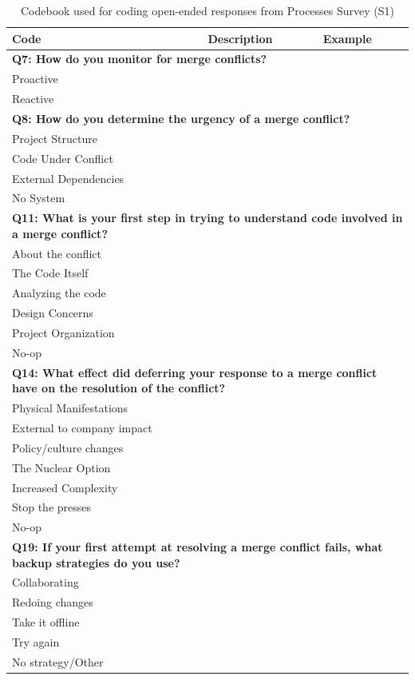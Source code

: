 \def\shift{\hspace{0.5em}}
\begin{table}[!htbp]
\centering
\caption{Codebook used for coding open-ended responses from Processes Survey (S1)}
\label{tab:codes}
\begin{tabular}{lp{1.5in}p{1.3in}}
\toprule
Code & Description & Example \\
\midrule
\multicolumn{3}{l}{\textbf{Q7: How do you monitor for merge conflicts?}} \\
\shift Proactive & & \\
\shift Reactive & & \\
\midrule
\multicolumn{3}{l}{\textbf{Q8: How do you determine the urgency of a merge conflict?}} \\
\shift Project Structure & & \\
\shift Code Under Conflict & & \\
\shift External Dependencies & & \\
\shift No System & & \\
\midrule
\multicolumn{3}{p{4.5in}}{\raggedright\textbf{Q11: What is your first step in trying to understand code involved in a merge conflict?}} \\
\shift About the conflict & & \\
\shift The Code Itself & & \\
\shift Analyzing the code & & \\
\shift Design Concerns & & \\
\shift Project Organization & & \\
\shift No-op & & \\
\midrule
\multicolumn{3}{p{4.5in}}{\raggedright\textbf{Q14: What effect did deferring your response to a merge conflict have on the resolution of the conflict?}} \\
\shift Physical Manifestations & & \\
\shift External to company impact & & \\
\shift Policy/culture changes & & \\
\shift The Nuclear Option & & \\
\shift Increased Complexity & & \\
\shift Stop the presses & & \\
\shift No-op & & \\
\midrule
\multicolumn{3}{p{4.5in}}{\raggedright\textbf{Q19: If your first attempt at resolving a merge conflict fails, what backup strategies do you use?}} \\
\shift Collaborating & & \\
\shift Redoing changes & & \\
\shift Take it offline & & \\
\shift Try again & & \\
\shift No strategy/Other & & \\
\bottomrule
\end{tabular}	
\end{table}

